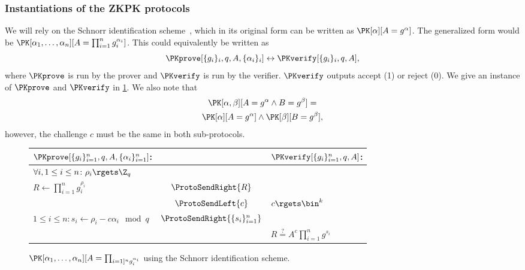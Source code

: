 \subsubsection{Instantiations of the \acs{ZKPK} protocols}


We will rely on the Schnorr identification scheme~\cite{Schnorr}, which in its 
original form can be written as \(\PK[\alpha][A = g^\alpha]\).
The generalized form would be \(\PK[\alpha_1, \dotsc, \alpha_n][A = 
    \prod_{i=1}^n g_i^{\alpha_i}]\).
This could equivalently be written as
\begin{equation*}
  \PKprove[\{g_i\}_i, q, A, \{\alpha_i\}_i] \leftrightarrow
  \PKverify[\{g_i\}_i, q, A],
\end{equation*}
where \(\PKprove\) is run by the prover and \(\PKverify\) is run by the 
verifier.
\(\PKverify\) outputs accept (1) or reject (0).
We give an instance of \(\PKprove\) and \(\PKverify\) in \cref{PKalgorithms}.
We also note that
\begin{multline*}
  \PK[\alpha, \beta][A = g^\alpha \land B = g^\beta] = \\
  \PK[\alpha][A = g^\alpha] \land \PK[\beta][B = g^\beta],
\end{multline*}
however, the challenge \(c\) must be the same in both sub-protocols.

\begin{figure*}
  \centering
  \begin{tabular}{lcl}
    \(\PKprove[\{g_i\}_{i=1}^n, q, A, \{\alpha_i\}_{i=1}^n]\):
    &
    & \(\PKverify[\{g_i\}_{i=1}^n, q, A]\):
    \\
    \midrule

    \(\forall i, 1\leq i\leq n\colon \rho_i\rgets \Z_q\)
    &
    &
    \\

    \(R\gets \prod_{i=1}^n g_i^{\rho_i}\)
    & \(\ProtoSendRight{R}\)
    &
    \\

    & \(\ProtoSendLeft{c}\)
    & \(c\rgets \bin^k\)
    \\

    \(1\leq i\leq n\colon s_i\gets \rho_i - c\alpha_i \mod q\)
    & \(\ProtoSendRight{\{s_i\}_{i=1}^n}\)
    &
    \\

    &
    & \(R \stackrel{?}{=} A^c \prod_{i=1}^n g^{s_i}\)
    \\
    
  \end{tabular}
  \caption{%
    \(\PK[\alpha_1, \dotsc, \alpha_n][A = \prod_{i=1]^n g_i^{\alpha_i}}\) using 
    the Schnorr identification scheme.
  }%
  \label{PKalgorithms}
\end{figure*}

